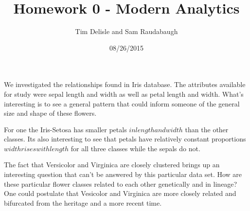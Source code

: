 \documentclass[12pt]{report}
\begin{document}
\lstset{language=Python} 

\title{Homework 0 - Modern Analytics}
\author{Tim Delisle and Sam Raudabaugh}
\date{08/26/2015}
\maketitle




We investigated the relationships found in Iris database. The attributes available for study were sepal length and width as well as petal length and width. What's interesting is to see a general pattern that could inform someone of the general size and shape of these flowers. 

For one the Iris-Setosa has smaller petals \(in length and width\) than the other classes. Its also interesting to see that petals have relatively constant proportions \( width rises with length \)  for all three classes while the sepals do not. 

The fact that Versicolor and Virginica are closely clustered brings up an interesting question that can't be answered by this particular data set. How are these particular flower classes related to each other genetically and in lineage? One could postulate that Vesicolor and Virginica are more closely related and bifurcated from the heritage and a more recent time.
\end{document}
